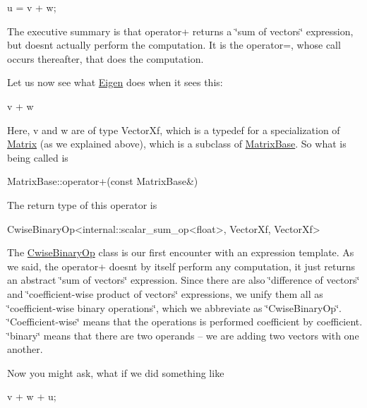 \begin{DoxyCode}
u = v + w;
\end{DoxyCode}


The executive summary is that operator+ returns a \char`\"{}sum of vectors\char`\"{} expression, but doesn\textquotesingle{}t actually perform the computation. It is the operator=, whose call occurs thereafter, that does the computation.

Let us now see what \hyperlink{namespace_eigen}{Eigen} does when it sees this\+:


\begin{DoxyCode}
v + w
\end{DoxyCode}


Here, v and w are of type Vector\+Xf, which is a typedef for a specialization of \hyperlink{group___core___module_class_eigen_1_1_matrix}{Matrix} (as we explained above), which is a subclass of \hyperlink{group___core___module_class_eigen_1_1_matrix_base}{Matrix\+Base}. So what is being called is


\begin{DoxyCode}
MatrixBase::operator+(\textcolor{keyword}{const} MatrixBase&)
\end{DoxyCode}


The return type of this operator is 
\begin{DoxyCode}
CwiseBinaryOp<internal::scalar\_sum\_op<float>, VectorXf, VectorXf>
\end{DoxyCode}
 The \hyperlink{group___core___module_class_eigen_1_1_cwise_binary_op}{Cwise\+Binary\+Op} class is our first encounter with an expression template. As we said, the operator+ doesn\textquotesingle{}t by itself perform any computation, it just returns an abstract \char`\"{}sum of vectors\char`\"{} expression. Since there are also \char`\"{}difference of vectors\char`\"{} and \char`\"{}coefficient-\/wise product of vectors\char`\"{} expressions, we unify them all as \char`\"{}coefficient-\/wise binary operations\char`\"{}, which we abbreviate as \char`\"{}\+Cwise\+Binary\+Op\char`\"{}. \char`\"{}\+Coefficient-\/wise\char`\"{} means that the operations is performed coefficient by coefficient. \char`\"{}binary\char`\"{} means that there are two operands -- we are adding two vectors with one another.

Now you might ask, what if we did something like


\begin{DoxyCode}
v + w + u;
\end{DoxyCode}


